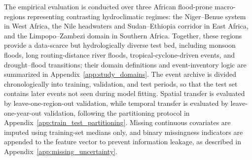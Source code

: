 \documentclass[pdflatex,sn-mathphys-ay]{sn-jnl}
\theoremstyle{thmstyleone}
\theoremstyle{thmstylethree}
\theoremstyle{thmstyletwo}
\begin{document}
The empirical evaluation is conducted over three African flood-prone
macro-regions representing contrasting hydroclimatic regimes: the
Niger--Benue system in West Africa, the Nile headwaters and
Sudan--Ethiopia corridor in East Africa, and the Limpopo--Zambezi
domain in Southern Africa.  Together, these regions provide a
data-scarce but hydrologically diverse test bed, including monsoon
floods, long routing-distance river floods, tropical-cyclone-driven
events, and drought--flood transitions; their domain definitions and
event-inventory logic are summarized in
Appendix~\ref{app:study_domains}.  The event archive is divided
chronologically into training, validation, and test periods, so that the
test set contains later events not seen during model fitting.  Spatial
transfer is evaluated by leave-one-region-out validation, while temporal
transfer is evaluated by leave-one-year-out validation, following the
partitioning protocol in Appendix~\ref{app:train_test_partitioning}.
Missing continuous covariates are imputed using training-set medians
only, and binary missingness indicators are appended to the feature
vector to prevent information leakage, as described in
Appendix~\ref{app:missing_uncertainty}.
\end{document}
